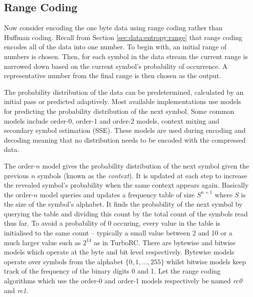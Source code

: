 \subsection{Range Coding}

Now consider encoding the one byte data using range coding rather than Huffman
coding. Recall
from Section \ref{sec:data:entropy:range}
that range coding encodes all of the data into one number. To
begin with, an initial range of numbers is chosen. Then, for each symbol in the
data stream the current range is narrowed down based on the current symbol's
probability of occurrence. A representative number from the final range is then
chosen as the output.

The probability distribution of the data can be predetermined, calculated by an
initial pass or predicted adaptively. Most available implementations use models
for predicting the probability distribution of the next symbol.
Some common models include order-0, order-1 and order-2 models, context mixing and
secondary symbol estimation (SSE). These models are used during encoding and
decoding meaning that no distribution needs to be encoded with the compressed
data.

The order-$n$ model gives the probability distribution of the next symbol given
the previous $n$ symbols (known as the \textit{context}). It is updated at each
step to increase the revealed symbol's probability when the same context appears
again.
Basically the order-$n$ model queries and updates a frequency table of
size $S^{n+1}$ where $S$ is the size of the symbol's alphabet.
It finds the probability of the next symbol by querying the table and
dividing this count by the total count of the symbols read thus far. To avoid a
probability of 0 occuring, every value in the table is initialised to the
same count -- typically a small value between 2 and 10 or a much larger
value such as $2^{14}$ as in TurboRC.
There are bytewise and bitwise models which operate at the byte and bit level
respectively. Bytewise models operate over symbols from the alphabet
$\{0,1,\dots,255\}$ whilst bitwise models keep track of the frequency of
the binary digits 0 and 1. Let the range coding algorithms which use the order-0
and order-1 models respectively be named \textit{rc0} and \textit{rc1}.

